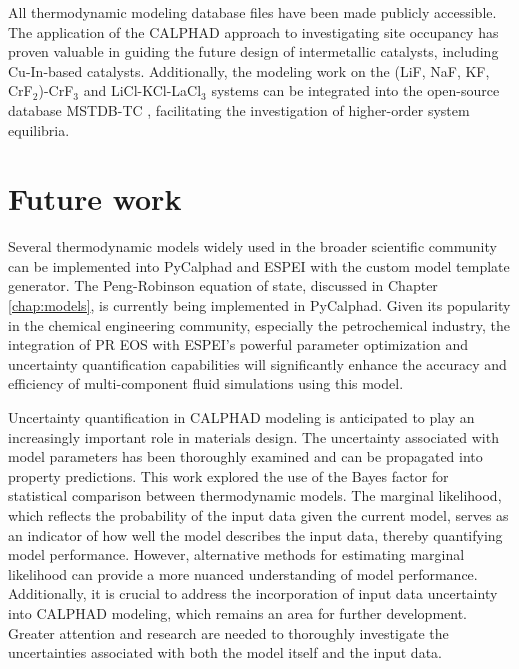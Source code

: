 All thermodynamic modeling database files have been made publicly accessible. The application of the CALPHAD approach to investigating site occupancy has proven valuable in guiding the future design of intermetallic catalysts, including Cu-In-based catalysts. Additionally, the modeling work on the (LiF, NaF, KF, CrF${_2}$)-CrF${_3}$ and LiCl-KCl-LaCl${_3}$ systems can be integrated into the open-source database MSTDB-TC \cite{ard2022development}, facilitating the investigation of higher-order system equilibria.

\section{Future work} \label{conclusion:sec:future}
Several thermodynamic models widely used in the broader scientific community can be implemented into PyCalphad and ESPEI with the custom model template generator. The Peng-Robinson equation of state, discussed in Chapter \ref{chap:models}, is currently being implemented in PyCalphad. Given its popularity in the chemical engineering community, especially the petrochemical industry, the integration of PR EOS with ESPEI's powerful parameter optimization and uncertainty quantification capabilities will significantly enhance the accuracy and efficiency of multi-component fluid simulations using this model. 

Uncertainty quantification in CALPHAD modeling is anticipated to play an increasingly important role in materials design. The uncertainty associated with model parameters has been thoroughly examined \cite{paulson2019quantified} and can be propagated into property predictions. This work explored the use of the Bayes factor for statistical comparison between thermodynamic models. The marginal likelihood, which reflects the probability of the input data given the current model, serves as an indicator of how well the model describes the input data, thereby quantifying model performance. However, alternative methods for estimating marginal likelihood can provide a more nuanced understanding of model performance. Additionally, it is crucial to address the incorporation of input data uncertainty into CALPHAD modeling, which remains an area for further development. Greater attention and research are needed to thoroughly investigate the uncertainties associated with both the model itself and the input data.

